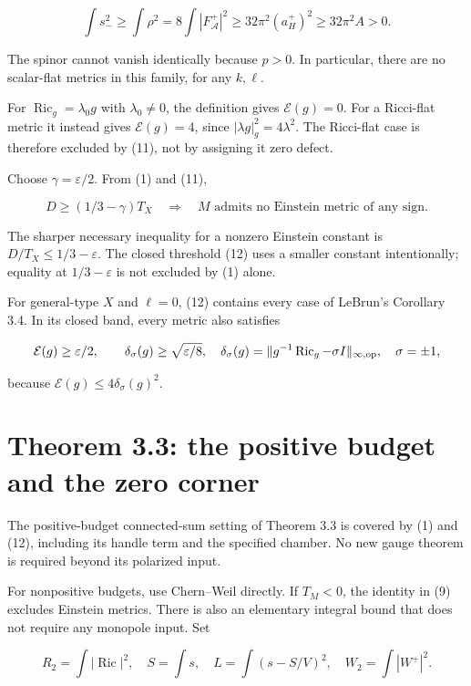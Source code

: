 \documentclass[
  10pt,
]{article}
\begin{document}
\[
\int s_-^2\ge\int\rho^2
=8\int|F_{\mathcal A}^+|^2
\ge32\pi^2(a_H^+)^2\ge32\pi^2A>0.                     \tag{11}
\]

The spinor cannot vanish identically because \(p>0\). In particular,
there are no scalar-flat metrics in this family, for any \(k,\ell\).

For \(\operatorname{Ric}_g=\lambda_0g\) with \(\lambda_0\ne0\), the
definition gives \(\mathcal E(g)=0\). For a Ricci-flat metric it instead
gives \(\mathcal E(g)=4\), since \(|\lambda g|_g^2=4\lambda^2\). The
Ricci-flat case is therefore excluded by (11), not by assigning it zero
defect.

Choose \(\gamma=\varepsilon/2\). From (1) and (11),

\[
\boxed{D\ge(1/3-\gamma)T_X
\quad\Longrightarrow\quad
M\text{ admits no Einstein metric of any sign}.}        \tag{12}
\]

The sharper necessary inequality for a nonzero Einstein constant is
\(D/T_X\le1/3-\varepsilon\). The closed threshold (12) uses a smaller
constant intentionally; equality at \(1/3-\varepsilon\) is not excluded
by (1) alone.

For general-type \(X\) and \(\ell=0\), (12) contains every case of
LeBrun's Corollary 3.4. In its closed band, every metric also satisfies

\[
\mathcal E(g)\ge\varepsilon/2,\qquad
\delta_\sigma(g)\ge\sqrt{\varepsilon/8},\quad
\delta_\sigma(g)=\|g^{-1}\operatorname{Ric}_g-\sigma I\|_{\infty,\rm op},
\quad \sigma=\pm1,
\]

because \(\mathcal E(g)\le4\delta_\sigma(g)^2\).

\hypertarget{theorem-3.3-the-positive-budget-and-the-zero-corner}{%
\section{Theorem 3.3: the positive budget and the zero
corner}\label{theorem-3.3-the-positive-budget-and-the-zero-corner}}

The positive-budget connected-sum setting of Theorem 3.3 is covered by
(1) and (12), including its handle term and the specified chamber. No
new gauge theorem is required beyond its polarized input.

For nonpositive budgets, use Chern--Weil directly. If \(T_M<0\), the
identity in (9) excludes Einstein metrics. There is also an elementary
integral bound that does not require any monopole input. Set

\[
R_2=\int|\operatorname{Ric}|^2,\quad S=\int s,\quad
L=\int(s-S/V)^2,\quad W_2=\int|W^+|^2.
\]
\end{document}
